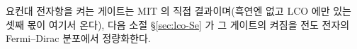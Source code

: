요컨대 전자항을 켜는 게이트는 MIT 의 직접 결과이며(흑연엔 없고 LCO 에만 있는 셋째 몫이 여기서 온다), 다음 소절
\S\ref{sec:lco-Se} 가 그 게이트의 켜짐을 전도 전자의 Fermi--Dirac 분포에서 정량화한다.
%

